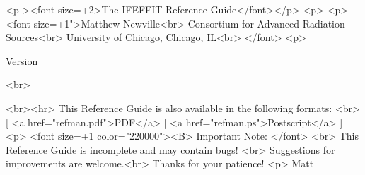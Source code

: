 
\begin{htmlonly}
  \begin{rawhtml}
    <p ><font size=+2>The IFEFFIT Reference Guide</font></p>
    <p>
    <p><font size=+1">Matthew Newville<br>
      Consortium for Advanced Radiation Sources<br>
      University of Chicago, Chicago, IL<br>
    </font>
    <p>
  \end{rawhtml}
  Version {\Vers}
  \begin{rawhtml}  <br> \end{rawhtml}
  {\update}
  \begin{rawhtml}  
    <br><hr>
    This Reference Guide is also available in the following formats: <br>
    [ <a href="refman.pdf">PDF</a> | <a href="refman.ps">Postscript</a> ]
    <p>
    <font size=+1 color="220000"><B>  Important Note: </font> <br>
    This Reference Guide is incomplete and may contain bugs! <br>
    Suggestions for improvements are  welcome.<br> 
    Thanks for your patience!    <p>
    Matt
  \end{rawhtml}
\end{htmlonly}


